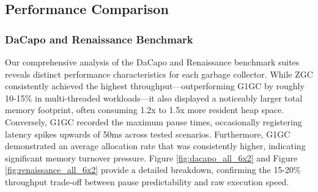 \subsection{Performance Comparison}
\subsubsection{DaCapo and Renaissance Benchmark}
Our comprehensive analysis of the DaCapo and Renaissance benchmark suites reveals distinct performance characteristics for each garbage collector. While ZGC consistently achieved the highest throughput—outperforming G1GC by roughly 10-15\% in multi-threaded workloads—it also displayed a noticeably larger total memory footprint, often consuming 1.2x to 1.5x more resident heap space. Conversely, G1GC recorded the maximum pause times, occasionally registering latency spikes upwards of 50ms across tested scenarios. Furthermore, G1GC demonstrated an average allocation rate that was consistently higher, indicating significant memory turnover pressure. Figure \ref{fig:dacapo_all_6x2} and Figure \ref{fig:renaissance_all_6x2} provide a detailed breakdown, confirming the 15-20\% throughput trade-off between pause predictability and raw execution speed.

